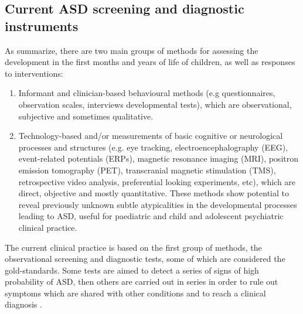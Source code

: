 \subsection{Current ASD screening and diagnostic instruments}
\label{sec:screeningdiagnostics}

As \citep{bolte2016detection} summarize, there are two main groups of methods for assessing the development in the first months and years of life of children, as well as responses to interventions:
\begin{enumerate}
    \item Informant and clinician-based behavioural methods (e.g questionnaires, observation scales, interviews developmental tests), which are observational, subjective and sometimes qualitative.
    \item Technology-based and/or measurements of basic cognitive or neurological processes and structures (e.g. eye tracking, electroencephalography (EEG), event-related potentials (ERPs), magnetic resonance imaging (MRI), positron emission tomography (PET), transcranial magnetic stimulation (TMS), retrospective video analysis, preferential looking experiments, etc), which are direct, objective and mostly quantitative. These methods show potential to reveal previously unknown subtle atypicalities in the developmental processes leading to ASD, useful for paediatric and child and adolescent psychiatric clinical practice.
\end{enumerate}
The current clinical practice is based on the first group of methods, the observational screening and diagnostic tests, some of which are considered the gold-standards. Some tests are aimed to detect a series of signs of high probability of ASD, then others are carried out in series in order to rule out symptoms which are shared with other conditions and to reach a clinical diagnosis \citep{vargas2016diagnosis}.\\
